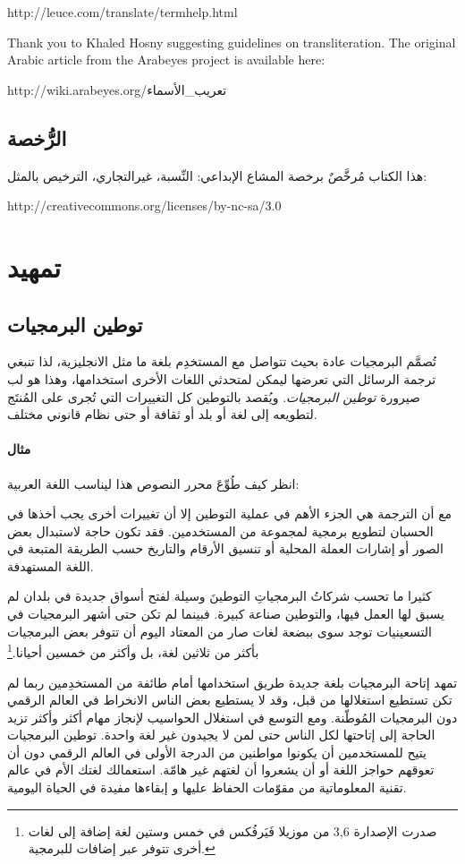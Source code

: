  http://leuce.com/translate/termhelp.html

Thank you to Khaled Hosny suggesting guidelines on transliteration. The
original Arabic article from the Arabeyes project is available here:

 http://wiki.arabeyes.org/تعريب\_الأسماء

\section{الرُّخصة}
هذا الكتاب مُرخَّصٌ برخصة المشاع الإبداعي: النِّسبة، غيرالتجاري، الترخيص
بالمثل:

http://creativecommons.org/licenses/by-nc-sa/3.0

\chapter{تمهيد}
\section{توطين البرمجيات}
تُصمَّم البرمجيات عادة بحيث تتواصل مع المستخدِم بلغة ما مثل الانجليزية،
لذا تنبغي ترجمة الرسائل التي تعرضها ليمكن لمتحدثي اللغات الأخرى
استخدامها، وهذا هو لب صيرورة {\it توطين البرمجيات}. ويُقصد بالتوطين كل
التغييرات التي تُجرى على المُنتَج لتطويعه إلى لغة أو بلد أو ثقافة أو
حتى نظام قانوني مختلف.

\subsubsection{مثال}
انظر كيف طُوِّعَ محرر النصوص هذا ليناسب اللغة العربية:



مع أن الترجمة هي الجزء الأهم في عملية التوطين إلا أن تغييرات أخرى يجب
أخذها في الحسبان لتطويع برمجية لمجموعة من المستخدمين. فقد تكون حاجة
لاستبدال بعض الصور أو إشارات العملة المحلية أو تنسيق الأرقام والتاريخ
حسب الطريقة المتبعة في اللغة المستهدفة.

كثيرا ما تحسب شركاتُ البرمجياتِ التوطينَ وسيلة لفتح أسواق جديدة في بلدان
لم يسبق لها العمل فيها، والتوطين صناعة كبيرة. فبينما لم تكن حتى أشهر
البرمجيات في التسعينيات توجد سوى ببضعة لغات صار من المعتاد اليوم أن
تتوفر بعض البرمجيات بأكثر من ثلاثين لغة، بل وأكثر من خمسين
أحيانا.\footnote{صدرت الإصدارة 3,6 من موزيلا فَيَرفُكس في خمس وستين لغة
إضافة إلى لغات أخرى تتوفر عبر إضافات للبرمجية.}

تمهد إتاحة البرمجيات بلغة جديدة طريق استخدامها أمام طائفة من المستخدِمين
ربما لم تكن تستطيع استغلالها من قبل، وقد لا يستطيع بعض الناس الانخراط
في العالم الرقمي دون البرمجيات المُوطّنة. ومع التوسع في استغلال
الحواسيب لإنجاز مهام أكثر وأكثر تزيد الحاجة إلى إتاحتها لكل الناس حتى
لمن لا يجيدون غير لغة واحدة. توطين البرمجيات يتيح للمستخدمين أن يكونوا
مواطنين من الدرجة الأولى في العالم الرقمي دون أن تعوقهم حواجز اللغة أو
أن يشعروا أن لغتهم غير هامّة. استعمالك لغتك الأم في عالم تقنية
المعلوماتية من مقوّمات الحفاظ عليها و إبقاءها مفيدة في الحياة اليومية.

